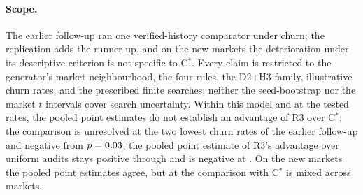 \documentclass[11pt]{article}
\begin{document}
\paragraph{Scope.} The earlier follow-up ran one verified-history comparator under churn; the replication adds the runner-up, and on the new markets the deterioration under its descriptive criterion is not specific to C$^*$. Every claim is restricted to the generator's market neighbourhood, the four rules, the D2+H3 family, illustrative churn rates, and the prescribed finite searches; neither the seed-bootstrap nor the market $t$ intervals cover search uncertainty. Within this model and at the tested rates, the pooled point estimates do not establish an advantage of R3 over C$^*$: the comparison is unresolved at the two lowest churn rates of the earlier follow-up and negative from $p = 0.03$; the pooled point estimate of R3's advantage over uniform audits stays positive through  and is negative at . On the new markets the pooled point estimates agree, but at  the comparison with C$^*$ is mixed across markets.

\begin{table}[t]\centering\small
{}
\caption{Exploratory follow-up, after the report: the D2+H3 gain $g$ against R3, C$^*$, and B3, and the contrasts $d$ = C$^*$ minus R3 and $q$ = B3 minus R3, pooled over the six fresh markets with equal weights, when each honest opponent replaces its identity with probability $p$ per round; $p$ =  is the registered no-churn result on the same seeds. Paired seed-bootstrap percentile intervals; frozen and doubled searches.}\label{tab:ph-churn}
\end{table}

\begin{table}[t]\centering\small
{}
\caption{Exploratory follow-up: pooled C$^*$ minus R3 and B3 minus R3 per churn rate with exploratory $t$ intervals over the six market differences ( degrees of freedom), frozen and doubled searches.}\label{tab:ph-churn-t}
\end{table}

\begin{table}[t]\centering\small
{}
\caption{Exploratory, post hoc: change of each market's C$^*$ minus R3 ($d$) and B3 minus R3 ($q$) from the same market's no-churn value (same search version), the mean over the six markets with an exploratory $t$ interval ( degrees of freedom), and the number of markets where the contrast is lower than without churn.}\label{tab:ph-churn-delta}
\end{table}
\end{document}
